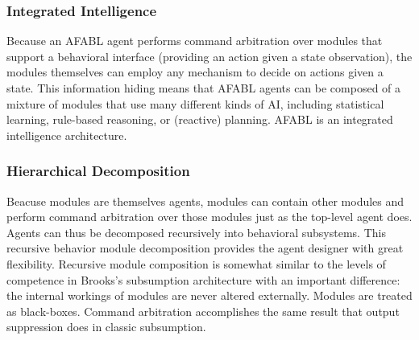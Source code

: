 \subsubsection{Integrated Intelligence}

Because an AFABL agent performs command arbitration over modules that
support a behavioral interface (providing an action given a state
observation), the modules themselves can employ any mechanism to
decide on actions given a state.  This information hiding means that
AFABL agents can be composed of a mixture of modules that use many
different kinds of AI, including statistical learning, rule-based
reasoning, or (reactive) planning.  AFABL is an integrated
intelligence architecture.



\subsubsection{Hierarchical Decomposition}


Beacuse modules are themselves agents, modules can contain other
modules and perform command arbitration over those modules just as the
top-level agent does.  Agents can thus be decomposed recursively into
behavioral subsystems.  This recursive behavior module decomposition
provides the agent designer with great flexibility.  Recursive module
composition is somewhat similar to the levels of competence in
Brooks's subsumption architecture with an important difference: the
internal workings of modules are never altered externally.  Modules
are treated as black-boxes.  Command arbitration accomplishes the same
result that output suppression does in classic subsumption.

